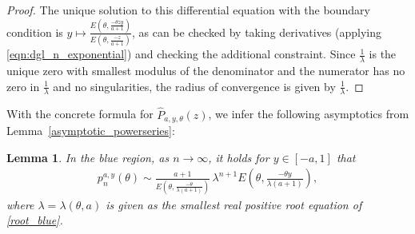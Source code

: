 \documentclass[12pt]{article}
\newcommand{\1}{\mathds{1}}
\theoremstyle{definition}
\theoremstyle{plain}
\newtheorem{Lemma}[definition]{Lemma}
\theoremstyle{remark}
\begin{document}
\begin{proof}
    The unique solution to this differential equation with the boundary condition is $y\mapsto\frac{E\left(\theta,\frac{-\theta zy}{a+1}\right)}{E\left(\theta,\frac{-z}{a+1}\right)}$, as can be checked by taking derivatives (applying \eqref{eqn:dgl_n_exponential}) and checking the additional constraint. Since $\frac{1}{\lambda}$ is the unique zero with smallest modulus of the denominator and the numerator has no zero in $\frac{1}{\lambda}$ and no singularities, the radius of convergence is given by $\frac{1}{\lambda}$.
 \end{proof}    
With the concrete formula for $\hat{P}_{a,y,\theta}(z)$, we infer the following asymptotics from Lemma~\ref{asymptotic_powerseries}:
\begin{Lemma}\label{asymptotic_blau_erste}
In the blue region, as $n\to\infty$, it holds for $y\in[-a,1]$ that
    \begin{align*}
       p_n^{a,y}(\theta)\sim \frac{a+1}{E\left(\theta,\frac{-\theta }{\lambda(a+1)}\right)}\, \lambda^{n+1}E\left(\theta,\frac{-\theta y}{\lambda(a+1)}\right),
    \end{align*}
    where $\lambda=\lambda(\theta,a)$ is given as the smallest real positive root equation of \eqref{root_blue}.
\end{Lemma}
\end{document}
